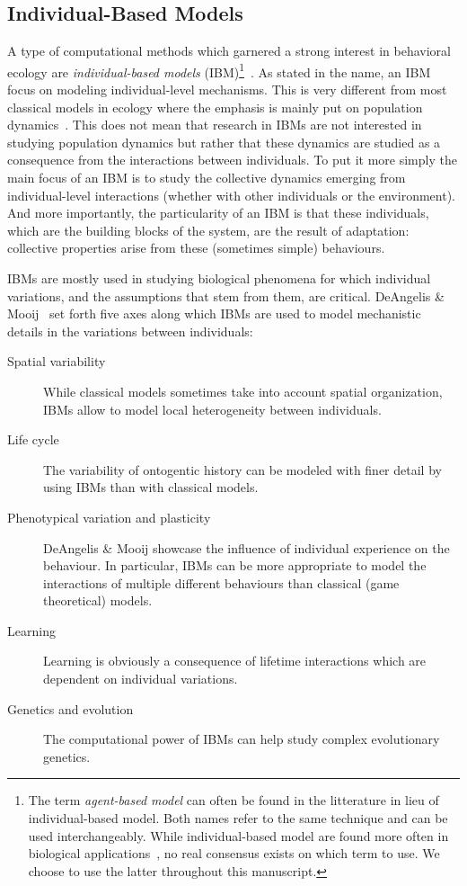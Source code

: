     \subsection{Individual-Based Models} 

        A type of computational methods which garnered a strong interest in behavioral ecology are \emph{individual-based models} (IBM)\footnote{The term \emph{agent-based model} can often be found in the litterature in lieu of individual-based model. Both names refer to the same technique and can be used interchangeably. While individual-based model are found more often in biological applications~\parencite{Grimm2005}, no real consensus exists on which term to use. We choose to use the latter throughout this manuscript.}~\parencite{Huston1988}. As stated in the name, an IBM focus on modeling individual-level mechanisms. This is very different from most classical models in ecology where the emphasis is mainly put on population dynamics~\parencite{Grimm2005}. This does not mean that research in IBMs are not interested in studying population dynamics but rather that these dynamics are studied as a consequence from the interactions between individuals. To put it more simply the main focus of an IBM is to study the collective dynamics emerging from individual-level interactions (whether with other individuals or the environment). And more importantly, the particularity of an IBM is that these individuals, which are the building blocks of the system, are the result of adaptation: collective properties arise from these (sometimes simple) behaviours.

        IBMs are mostly used in studying biological phenomena for which individual variations, and the assumptions that stem from them, are critical. DeAngelis \& Mooij~\parencite{DeAngelis2005} set forth five axes along which IBMs are used to model mechanistic details in the variations between individuals:

        \begin{description}
            \item[Spatial variability] {While classical models sometimes take into account spatial organization, IBMs allow to model local heterogeneity between individuals.}
            \item[Life cycle] {The variability of ontogentic history can be modeled with finer detail by using IBMs than with classical models.}
            \item[Phenotypical variation and plasticity] {DeAngelis \& Mooij showcase the influence of individual experience on the behaviour. In particular, IBMs can be more appropriate to model the interactions of multiple different behaviours than classical (game theoretical) models.}
            \item[Learning] {Learning is obviously a consequence of lifetime interactions which are dependent on individual variations.}
            \item[Genetics and evolution] {The computational power of IBMs can help study complex evolutionary genetics.}
        \end{description}

